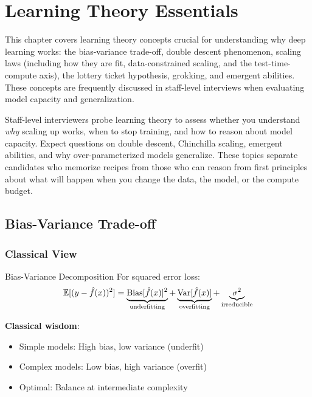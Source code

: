 \chapter{Learning Theory Essentials}
\label{chap:learning_theory}

\begin{tldr}
This chapter covers learning theory concepts crucial for understanding why deep learning works: the bias-variance trade-off, double descent phenomenon, scaling laws (including how they are fit, data-constrained scaling, and the test-time-compute axis), the lottery ticket hypothesis, grokking, and emergent abilities. These concepts are frequently discussed in staff-level interviews when evaluating model capacity and generalization.
\end{tldr}

Staff-level interviewers probe learning theory to assess whether you understand \textit{why} scaling up works, when to stop training, and how to reason about model capacity. Expect questions on double descent, Chinchilla scaling, emergent abilities, and why over-parameterized models generalize. These topics separate candidates who memorize recipes from those who can reason from first principles about what will happen when you change the data, the model, or the compute budget.

\bigskip

\section{Bias-Variance Trade-off}
\label{sec:bias_variance}

\subsection{Classical View}

\begin{mathresult}{Bias-Variance Decomposition}
For squared error loss:
\begin{equation}
\operatorname{\mathbb{E}}[(y - \hat{f}(x))^2] = \underbrace{\text{Bias}[\hat{f}(x)]^2}_{\text{underfitting}} + \underbrace{\operatorname{Var}[\hat{f}(x)]}_{\text{overfitting}} + \underbrace{\sigma^2}_{\text{irreducible}}
\end{equation}
\end{mathresult}

\textbf{Classical wisdom}:
\begin{itemize}
    \item Simple models: High bias, low variance (underfit)
    \item Complex models: Low bias, high variance (overfit)
    \item Optimal: Balance at intermediate complexity
\end{itemize}


